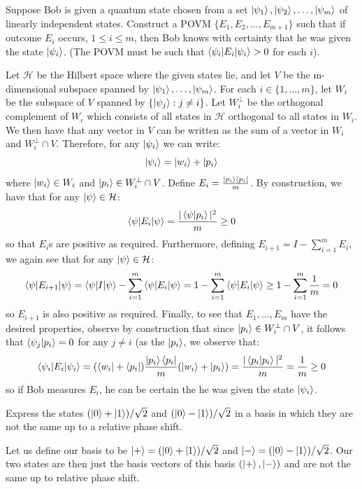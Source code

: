 \begin{example}
    Suppose Bob is given a quantum state chosen from a set $\ket{\psi_1},\ket{\psi_2},\ldots,\ket{\psi_m}$ of linearly independent states. Construct a POVM $\{E_1,E_2,\ldots,E_{m+1}\}$ such that if outcome $E_i$ occurs, $1\leq i\leq m$, then Bob knows with certainty that he was given the state $\ket{\psi_i}$. (The POVM must be such that $\braket{\psi_i|E_i|\psi_i} > 0$ for each $i$).

Let $\mathcal{H}$ be the Hilbert space where the given states lie, and let $V$ be the m-dimensional subspace spanned by $\ket{\psi_1},\ldots,\ket{\psi_m}$. For each $i\in\{1,\ldots,m\}$, let $W_i$ be the subspace of $V$ spanned by $\{\ket{\psi_j}:j\neq i\}$. Let $W_i^{\perp}$ be the orthogonal complement of $W_i$ which consists of all states in $\mathcal{H}$ orthogonal to all states in $W_i$. We then have that any vector in $V$ can be written as the sum of a vector in $W_i$ and $W_i^{\perp} \cap V$. Therefore, for any $\ket{\psi_i}$ we can write:
\[
\ket{\psi_i}=\ket{w_i}+\ket{p_i}
\]
where $\ket{w_i}\in W_i$ and $\ket{p_i} \in W_i^{\perp} \cap V$. Define $E_i=\frac{\ket{p_i}\bra{p_i}}{m}$. By construction, we have that for any $\ket{\psi} \in \mathcal{H}$:
\[
\braket{\psi|E_i|\psi} =\frac{|\braket{\psi|p_i}|^2}{m} \geq 0
\]
so that $E_i$s are positive as required. Furthermore, defining $E_{i+1}=I-\sum_{i=1}^m E_i$, we again see that for any $\ket{\psi} \in \mathcal{H}$:
\[
\braket{\psi|E_{i+1}|\psi}=\braket{\psi|I|\psi}-\sum_{i=1}^m \braket{\psi|E_i|\psi}=1-\sum_{i=1}^m \braket{\psi|E_i|\psi}\geq 1-\sum_{i=1}^m \frac{1}{m}=0
\]
so $E_{i+1}$ is also positive as required. Finally, to see that $E_1,\ldots,E_m$ have the desired properties, observe by construction that since $\ket{p_i} \in W_i^{\perp} \cap V$, it follows that $\braket{\psi_j|p_i}=0$ for any $j\neq i$ (as the $\ket{p_i}$, we observe that:
\[
\braket{\psi_i|E_i|\psi_i}=(\bra{w_i}+\bra{p_i})\frac{\ket{p_i}\bra{p_i}}{m} (\ket{w_i}+\ket{p_i}) = \frac{|\braket{p_i|p_i}|^2}{m}=\frac{1}{m}\geq 0
\]
so if Bob measures $E_i$, he can be certain the he was given the state $\ket{\psi_i}$.
\end{example}
\begin{example}
    Express the states $(\ket{0}+\ket{1})/\sqrt{2}$ and $(\ket{0}-\ket{1})/\sqrt{2}$ in a basis in which they are not the same up to a relative phase shift. 
    
    Let us define our basis to be $\ket{+}=(\ket{0}+\ket{1})/\sqrt{2}$ and $\ket{-}=(\ket{0}-\ket{1})/\sqrt{2}$. Our two states are then just the basis vectors of this basis $(\ket{+},\ket{-})$ and are not the same up to relative phase shift.
\end{example}
